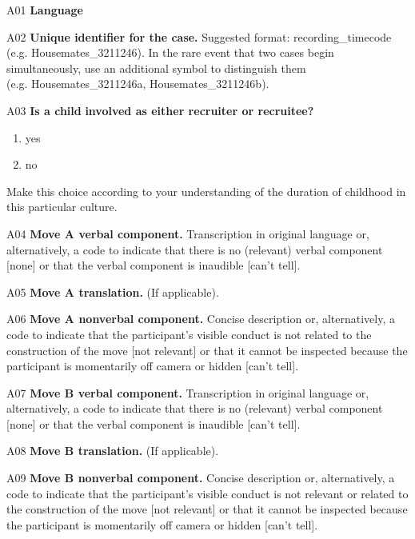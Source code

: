 \documentclass[output=paper]{langsci/langscibook}
\begin{document}
\begin{description}
\item A01   \textbf{Language}
\item A02  \textbf{Unique identifier for the case.} Suggested format: recording\_timecode (e.g. Housemates\_3211246). In the rare event that two cases begin simultaneously, use an additional symbol to distinguish them\\(e.g. Housemates\_3211246a, Housemates\_3211246b).
\item
{A03   \textbf{Is a child }\textbf{involved as either recruiter or recruitee?}
\begin{enumerate}
\item {yes}
\item {no}
\end{enumerate}
{Make this choice according to your understanding of the duration of childhood in this particular culture.}\footnotemark{}}
\item
{A04  \textbf{Move A verbal component.} Transcription in original language or, alternatively, a code to indicate that there is no (relevant) verbal component [none] or that the verbal component is inaudible [can’t tell].}
\item
A05  \textbf{Move A translation.} (If applicable).
\item
A06  \textbf{Move A nonverbal component.} Concise description or, alternatively, a code to indicate that the participant’s visible conduct is not related to the construction of the move [not relevant] or that it cannot be inspected because the participant is momentarily off camera or hidden [can’t tell].
\item
A07  \textbf{Move B verbal component.} Transcription in original language or, alternatively, a code to indicate that there is no (relevant) verbal component [none] or that the verbal component is inaudible [can’t tell].
\item
A08  \textbf{Move B translation.} (If applicable).
\item
A09  \textbf{Move B nonverbal component.} Concise description or, alternatively, a code to indicate that the participant’s visible conduct is not relevant or related to the construction of the move [not relevant] or that it cannot be inspected because the participant is momentarily off camera or hidden [can’t tell].


\end{description}
\end{document}
